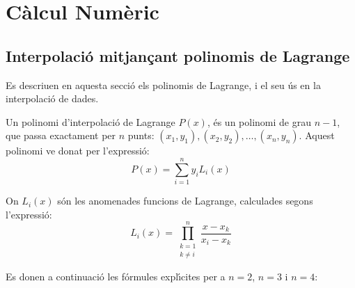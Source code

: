 \chapter{C\`{a}lcul Num\`{e}ric} 

\section{Interpolaci\'{o} mitjan\c{c}ant polinomis de Lagrange}

Es descriuen en aquesta secci\'{o} els polinomis de Lagrange, i el seu \'{u}s en la interpolaci\'{o} de dades.

Un polinomi d'interpolaci\'{o} de Lagrange $P(x)$, \'{e}s un polinomi de grau $n-1$, que passa exactament per $n$ punts:
$(x_1, y_1), (x_2, y_2), \dots, (x_n, y_n)$. Aquest polinomi ve donat per l'expressi\'{o}:
\begin{equation}
  P(x) = \sum_{i=1}^{n}  y_i L_i(x) \label{eq:poly_lag_1}
\end{equation}

On $L_i(x)$ s\'{o}n les anomenades funcions de Lagrange, calculades segons l'expressi\'{o}:
\begin{equation}
  L_i(x) = \prod_{\substack{k=1 \\ k\neq i}}^{n} \frac{x-x_k}{x_i-x_k} \label{eq:poly_lag_2}
\end{equation}

Es donen a continuaci\'{o} les f\'{o}rmules expl\'{\i}cites per a $n = 2$, $n=3$ i $n=4$:

